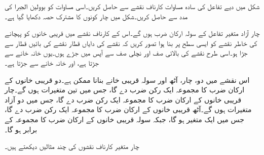  شکل  میں دیے تفاعل کی سادہ مساوات کارناف نقشے سے حاصل کریں۔اسی مساوات کو بوولین الجبرا کی مدد سے حاصل کریں۔شکل میں چار کونوں کا مشترک حصہ  دکھایا گیا ہے۔ 


چار آزاد متغیر تفاعل کے سولہ ارکان ضرب ہوں گے۔اس کے کارناف نقشے میں قریبی خانوں کو پہچانے کی خاطر نقشے کو ایسی سطح پر بنا ہوا تصور کریں کہ نقشے کی دایاں قطار نقشے کی بائیں قطار سے جڑا ہو۔اسی طرح نقشے کی بالائی صف اور نچلی صف سے آپس میں جڑے ہوں۔یوں  خانہ  خانے سے جڑتا ہے، اور  خانہ  خانے سے جڑتا ہے۔

اس نقشے میں دو، چار، آٹھ اور سولہ قریبی خانے بنانا ممکن ہے۔دو قریبی خانوں کے ارکان ضرب کا مجموعہ ایک رکن ضرب دے گا، جس میں تین متغیرات ہوں گے۔چار قریبی خانوں کے ارکان ضرب کا مجموعہ ایک رکن ضرب دے گا، جس میں دو آزاد متغیرات ہوں گے۔آٹھ قریبی خانوں کے ارکان ضرب کا مجموعہ ایک رکن ضرب دے گا، جس میں ایک متغیر ہو گا، جبکہ سولہ قریبی خانوں کے ارکان ضرب کا مجموعہ  کے برابر ہو گا۔

چار متغیر کارناف نقشوں کی چند مثالیں دیکھتے ہیں۔


